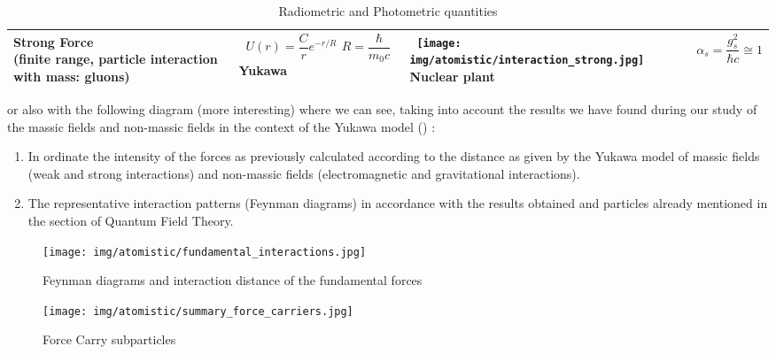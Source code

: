 \begin{table}[H]
\begin{center}
\begin{tabular}{|m{5.5cm}|m{3.5cm}|m{3cm}|m{3cm}|}
		 \hline 
		 \pbox{5cm}{Strong Force \\ \tiny (finite range, particle interaction with mass: gluons)} & \centering\arraybackslash\ \pbox{5cm}{$U(r)=\dfrac{C}{r}e^{-r/R}$ \\ $R=\dfrac{\hbar}{m_0c}$ \\ \tiny Yukawa} & \centering\arraybackslash\  \pbox{5cm}{\texttt{[image: img/atomistic/interaction\_strong.jpg]} \\ \tiny Nuclear plant} & \centering\arraybackslash\ $\alpha_s=\dfrac{g_s^2}{\hbar c}\cong 1$ \\ 
		 \hline 
		 \end{tabular}
		\caption[]{Radiometric and Photometric quantities}
		\end{center}
	\end{table}
	 or also with the following diagram (more interesting) where we can see, taking into account the results we have found during our study of the massic fields and non-massic fields in the context of the Yukawa model () : 
	\begin{enumerate}
		\item In ordinate the intensity of the forces as previously calculated according to the distance as given by the Yukawa model of massic fields (weak and strong interactions) and non-massic fields (electromagnetic and gravitational interactions).

		\item The representative interaction patterns (Feynman diagrams) in accordance with the results obtained and particles already mentioned in the section of Quantum Field Theory.
	\end{enumerate}
	\begin{figure}[H]
		\begin{center}
		\texttt{[image: img/atomistic/fundamental\_interactions.jpg]}
		\end{center}	
		\caption{Feynman diagrams and interaction distance of the fundamental forces}
	\end{figure}
	 
	 \begin{figure}[H]
		\begin{center}
		\texttt{[image: img/atomistic/summary\_force\_carriers.jpg]}
		\end{center}	
		\caption{Force Carry subparticles}
	\end{figure}
	

